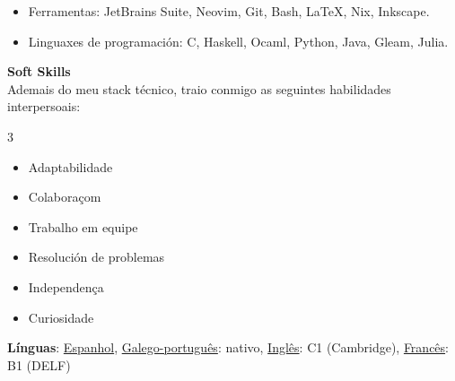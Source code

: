 \documentclass [10pt, a4paper] {extarticle}
\newcommand{\rightcolumwidth}{ 0.84 }
\begin{document}
  \begin {flushright}
  \begin {minipage} [t] {\rightcolumwidth\textwidth}

    \vspace {-8px}
    \begin {itemize} [noitemsep]
      \item Ferramentas: JetBrains Suite, Neovim, Git, Bash, LaTeX, Nix, Inkscape.
      \item Linguaxes de programación: C, Haskell, Ocaml, Python, Java, Gleam, Julia.
    \end {itemize}

      \textbf {Soft Skills} \\ [4px]
      Ademais do meu stack técnico, traio conmigo as seguintes habilidades interpersoais:
      \vspace {-8px}
      \begin{multicols}{3}
      \begin {itemize} [noitemsep]
        \item Adaptabilidade
        \item Colaboraçom
        \item Trabalho em equipe
        \item Resolución de problemas
        \item Independença
        \item Curiosidade
      \end {itemize}
      \end{multicols}

      \textbf{Línguas}: \underline{Espanhol}, \underline{Galego-português}: nativo, \underline{Inglês}: C1 (Cambridge), \underline{Francês}: B1 (DELF)

  \end {minipage}
  \end {flushright}
\end{document}
